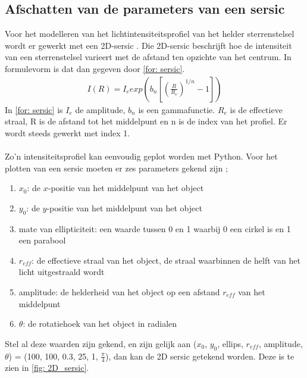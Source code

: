 \subsection{Afschatten van de parameters van een sersic}
Voor het modelleren van het lichtintensiteitsprofiel van het helder sterrenstelsel wordt er gewerkt met een 2D-sersic
\cite{unknown-author-no-date-sersic}
\cite{wikipedia-contributors-2024}. Die 2D-sersic beschrijft hoe de intensiteit van een sterrenstelsel varieert met de afstand ten opzichte van het centrum. In formulevorm is dat dan gegeven door \cref{for: sersic}.
\begin{align}
    I(R)=I_{e}exp\left(b_{n}\left[\left(\frac{R}{R_{e}}\right)^{1/n}-1\right]\right)
    \label{for: sersic}
\end{align}
In \cref{for: sersic} is $I_{e}$ de amplitude, $b_{n}$ is een gammafunctie. $R_{e}$ is de effectieve straal, R is de afstand tot het middelpunt en n is de index van het profiel. Er wordt steeds gewerkt met index 1.\\ \\
Zo'n intensiteitsprofiel kan eenvoudig geplot worden met Python. Voor het plotten van een sersic moeten er zes parameters gekend zijn \cite{unknown-author-no-date-info-sersic};
\begin{enumerate}
    \item $x_{0}$: de $x$-positie van het middelpunt van het object
    \item $y_{0}$: de $y$-positie van het middelpunt van het object
    \item mate van ellipticiteit: een waarde tussen 0 en 1 waarbij 0 een cirkel is en 1 een parabool
    \item $r_{eff}$: de effectieve straal van het object, de straal waarbinnen de helft van het licht uitgestraald wordt \cite{wikipedia-contributors-2023-reff}
    \item amplitude: de helderheid van het object op een afstand $r_{eff}$ van het middelpunt
    \item $\theta$: de rotatiehoek van het object in radialen
\end{enumerate}
Stel al deze waarden zijn gekend, en zijn gelijk aan ($x_0$, $y_0$, ellips, $r_{eff}$, amplitude, $\theta$) = (100, 100, 0.3, 25, 1, $\frac{\pi}{4}$),
dan kan de 2D sersic getekend worden. Deze is te zien in \cref{fig: 2D_sersic}.
